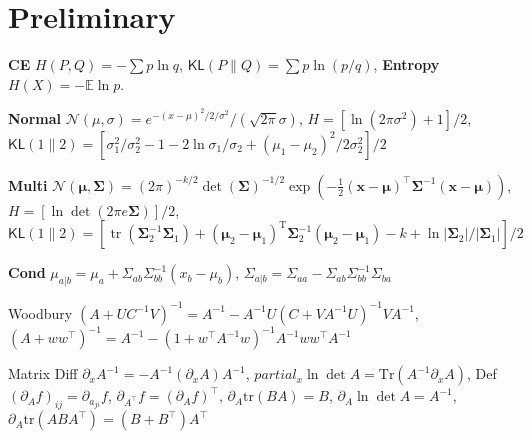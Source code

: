 \section{Preliminary}
\textbf{CE} $H(P, Q)=-\sum p \ln q$, $\mathsf{KL}(P \| Q)=\sum p \ln (p/q)$, \textbf{Entropy} $H(X) = - \mathbb{E} \ln p$. 

\textbf{Normal} $\mathcal{N}(\mu, \sigma)=e^{-(x-\mu)^2/2/\sigma^2}/(\sqrt{2\pi}\sigma)$, $H=[\ln(2\pi\sigma^2)+1]/2$, $\mathsf{KL}(1\|2)=[\sigma_1^2/\sigma_2^2 - 1 - 2\ln \sigma_1/\sigma_2 + (\mu_1-\mu_2)^2/2\sigma_2^2]/2$

\textbf{Multi} $\mathcal{N}(\boldsymbol{\mu}, \boldsymbol{\Sigma})=(2 \pi)^{-k / 2} \operatorname{det}(\boldsymbol{\Sigma})^{-1 / 2} \exp (-\frac{1}{2}(\mathbf{x}-\boldsymbol{\mu})^{\top} \boldsymbol{\Sigma}^{-1}(\mathbf{x}-\boldsymbol{\mu}))$,
$H = [\ln \det (2\pi e \boldsymbol{\Sigma})]/2$,
$\mathsf{KL}(1\|2)=[\operatorname{tr}(\boldsymbol{\Sigma}_2^{-1} \boldsymbol{\Sigma}_1)+(\boldsymbol{\mu}_2-\boldsymbol{\mu}_1)^{\mathrm{T}} \boldsymbol{\Sigma}_2^{-1}(\boldsymbol{\mu}_2-\boldsymbol{\mu}_1)-k + \ln |\boldsymbol{\Sigma}_2| / |\boldsymbol{\Sigma}_1|]/2$

\textbf{Cond} $\mu_{a|b} =\mu_a+\Sigma_{ab}\Sigma_{bb}^{-1}(x_b-\mu_b)$, $\Sigma_{a|b} = \Sigma_{aa} - \Sigma_{ab}\Sigma_{bb}^{-1}\Sigma_{ba}$

Woodbury $(A + U C^{-1} V)^{-1} = A^{-1} - A^{-1}U(C+VA^{-1}U)^{-1}V A^{-1}$, $(A + ww^{\top})^{-1} = A^{-1} -  (1+w^{\top}A^{-1}w)^{-1} A^{-1}ww^{\top} A^{-1}$

Matrix Diff $\partial_x A^{-1} =-A^{-1} (\partial_x A) A^{-1}$,
$partial_x\ln\det A=\mathrm{Tr}(A^{-1}\partial_x A)$,
Def $(\partial_A f)_{ij}=\partial_{a_{ji}} f$, 
$\partial_{A^{\top}} f = (\partial_A f)^{\top}$,
$\partial_A \mathrm{tr}(BA)=B$, $\partial_A \ln\det A=A^{-1}$,
$\partial_A \mathrm{tr}(ABA^{\top})=(B+B^{\top})A^{\top}$
